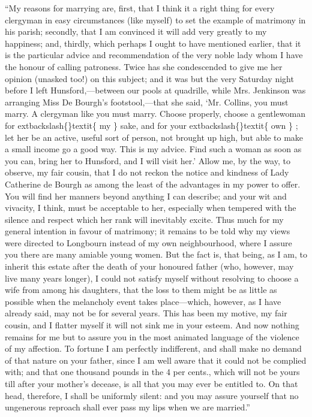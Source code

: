 \documentclass[10pt]{book}
\begin{document}
   “My reasons for marrying are, first, that I think it a right thing for
every clergyman in easy circumstances (like myself) to set the example
of matrimony in his parish; secondly, that I am convinced it will add
very greatly to my happiness; and, thirdly, which perhaps I ought to
have mentioned earlier, that it is the particular advice and
recommendation of the very noble lady whom I have the honour of calling
patroness. Twice has she condescended to give me her opinion (unasked
too!) on this subject; and it was but the very Saturday night before I
left Hunsford,—between our pools at quadrille, while Mrs. Jenkinson was
arranging Miss De Bourgh’s footstool,—that she said, ‘Mr. Collins, you
must marry. A clergyman like you must marry. Choose properly, choose a
gentlewoman for
   	extbackslash\{\}textit\{
    my
   \}
   sake, and for your
   	extbackslash\{\}textit\{
    own
   \}
   ; let her be an active,
useful sort of person, not brought up high, but able to make a small
income go a good way. This is my advice. Find such a woman as soon as
you can, bring her to Hunsford, and
   I will visit her.’ Allow me, by the
way, to observe, my fair cousin, that I do not reckon the notice and
kindness of Lady Catherine de Bourgh as among the least of the
advantages in my power to offer. You will find her manners beyond
anything I can describe; and your wit and vivacity, I think, must be
acceptable to her, especially when tempered with the silence and respect
which her rank will inevitably excite. Thus much for my general
intention in favour of matrimony; it remains to be told why my views
were directed to Longbourn instead of my own neighbourhood, where I
assure you there are many amiable young women. But the fact is, that
being, as I am, to inherit this estate after the death of your honoured
father (who, however, may live many years longer), I could not satisfy
myself without resolving to choose a wife from among his daughters, that
the loss to them might be as little as possible when the melancholy
event takes place—which, however, as I have already said, may not be
for several years. This has been my motive, my fair cousin, and I
flatter myself it will not sink me in your esteem. And now nothing
remains for me but to assure you in the most animated language of the
violence of my affection. To fortune I am perfectly indifferent, and
shall make no demand of that nature on your father, since I am well
aware that it could not be complied with; and that one thousand pounds
in the 4 per cents., which will not be yours till after your mother’s
decease, is all that you may ever be entitled to. On that head,
therefore, I shall be uniformly silent: and you may assure yourself that
no ungenerous reproach shall ever pass my lips when we are married.”
  
\end{document}
